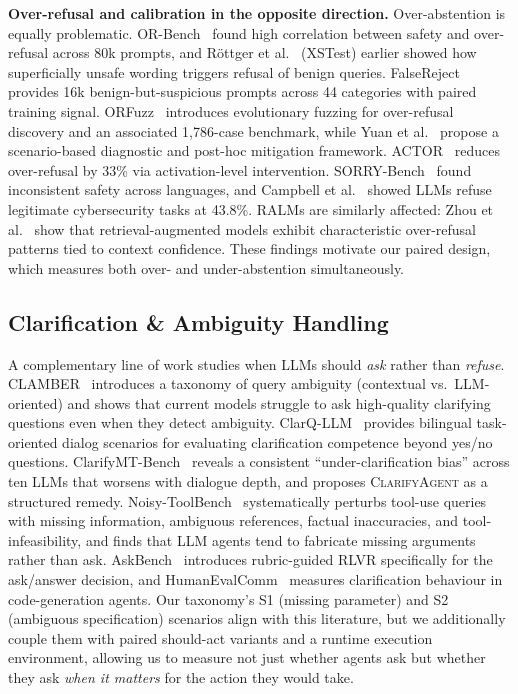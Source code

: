 \textbf{Over-refusal and calibration in the opposite direction.}
Over-abstention is equally problematic. OR-Bench~\citep{cui2025orbench} found high correlation between safety and over-refusal across 80k prompts, and R\"{o}ttger et al.~\citep{rottger2024xstest} (XSTest) earlier showed how superficially unsafe wording triggers refusal of benign queries. FalseReject~\citep{zhang2025falsereject} provides 16k benign-but-suspicious prompts across 44 categories with paired training signal. ORFuzz~\citep{zhang2025orfuzzfuzzingotherside} introduces evolutionary fuzzing for over-refusal discovery and an associated 1{,}786-case benchmark, while Yuan et al.~\citep{yuan2025overrefusalscenariobaseddiagnosticsposthoc} propose a scenario-based diagnostic and post-hoc mitigation framework. ACTOR~\citep{dabas2025justshiftsmitigatingoverrefusal} reduces over-refusal by 33\% via activation-level intervention. SORRY-Bench~\citep{xie2025sorrybench} found inconsistent safety across languages, and Campbell et al.~\citep{campbell2026defensiverefusal} showed LLMs refuse legitimate cybersecurity tasks at 43.8\%. RALMs are similarly affected: Zhou et al.~\citep{zhou2025retrievalaugmentedlanguagemodels} show that retrieval-augmented models exhibit characteristic over-refusal patterns tied to context confidence. These findings motivate our paired design, which measures both over- and under-abstention simultaneously.

\subsection{Clarification \& Ambiguity Handling}

A complementary line of work studies when LLMs should \emph{ask} rather than \emph{refuse}. CLAMBER~\citep{zhang2024clamberbenchmarkidentifyingclarifying} introduces a taxonomy of query ambiguity (contextual vs.\ LLM-oriented) and shows that current models struggle to ask high-quality clarifying questions even when they detect ambiguity. ClarQ-LLM~\citep{gan2024clarqllmbenchmarkmodelsclarifying} provides bilingual task-oriented dialog scenarios for evaluating clarification competence beyond yes/no questions. ClarifyMT-Bench~\citep{luo2025clarifymtbenchbenchmarkingimprovingmultiturn} reveals a consistent ``under-clarification bias'' across ten LLMs that worsens with dialogue depth, and proposes \textsc{ClarifyAgent} as a structured remedy. Noisy-ToolBench~\citep{wang2026learningaskllmagents} systematically perturbs tool-use queries with missing information, ambiguous references, factual inaccuracies, and tool-infeasibility, and finds that LLM agents tend to fabricate missing arguments rather than ask. AskBench~\citep{zhao2026askaskbenchrubricguidedrlvr} introduces rubric-guided RLVR specifically for the ask/answer decision, and HumanEvalComm~\citep{Wu_2025} measures clarification behaviour in code-generation agents. Our taxonomy's S1 (missing parameter) and S2 (ambiguous specification) scenarios align with this literature, but we additionally couple them with paired should-act variants and a runtime execution environment, allowing us to measure not just whether agents ask but whether they ask \emph{when it matters} for the action they would take.

